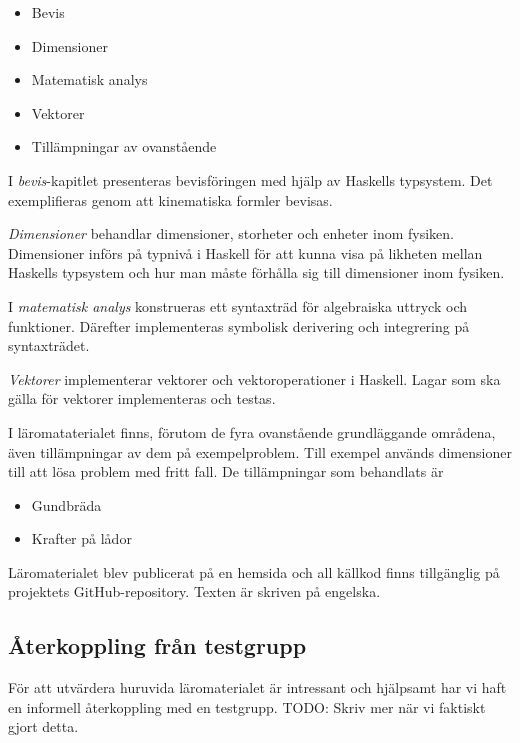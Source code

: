 \begin{draft}
\begin{itemize}
  \item Bevis
  \item Dimensioner
  \item Matematisk analys
  \item Vektorer
  \item Tillämpningar av ovanstående
\end{itemize}

I \textit{bevis}-kapitlet presenteras bevisföringen med hjälp av Haskells typsystem. Det exemplifieras genom att kinematiska formler bevisas.

\textit{Dimensioner} behandlar dimensioner, storheter och enheter inom fysiken. Dimensioner införs på typnivå i Haskell för att kunna visa på likheten mellan Haskells typsystem och hur man måste förhålla sig till dimensioner inom fysiken.

I \textit{matematisk analys} konstrueras ett syntaxträd för algebraiska uttryck och funktioner. Därefter implementeras symbolisk derivering och integrering på syntaxträdet.

\textit{Vektorer} implementerar vektorer och vektoroperationer i Haskell. Lagar som ska gälla för vektorer implementeras och testas.

I läromataterialet finns, förutom de fyra ovanstående grundläggande områdena, även tillämpningar av dem på exempelproblem. Till exempel används dimensioner till att lösa problem med fritt fall. De tillämpningar som behandlats är

\begin{itemize}
  \item Gundbräda
  \item Krafter på lådor
\end{itemize}

Läromaterialet blev publicerat på en hemsida\cite{LYAP} och all källkod finns tillgänglig på projektets GitHub-repository.\cite{LYAP_repo} Texten är skriven på engelska.

\end{draft}

\begin{binge}

\section{Återkoppling från testgrupp}

För att utvärdera huruvida läromaterialet är intressant och hjälpsamt har vi
haft en informell återkoppling med en testgrupp. TODO: Skriv mer när vi
faktiskt gjort detta.

\end{binge}
